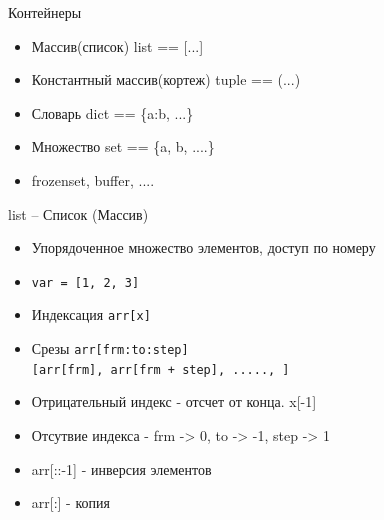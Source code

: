 \documentclass{article}
\begin{document}
\LARGE

\begin{center} Контейнеры \end{center}
\begin{itemize}
	\item Массив(список) list == [...]
	\item Константный массив(кортеж) tuple == (...)
	\item Словарь dict == \{a:b, ...\}
	\item Множество set == \{a, b, ....\}
	\item frozenset, buffer, ....
\end{itemize}
\newpage

\begin{center} list – Список (Массив) \end{center}
\begin{itemize}
	\item Упорядоченное множество элементов, доступ по номеру
	\item \lstinline!var = [1, 2, 3]!
	\item Индексация \lstinline!arr[x]!
	\item Срезы 
			\lstinline!arr[frm:to:step]! \\
			\lstinline![arr[frm], arr[frm + step], ....., ]!
	\item Отрицательный индекс - отсчет от конца. x[-1]
	\item Отсутвие индекса - frm -> 0, to -> -1, step -> 1
	\item arr[::-1] - инверсия элементов
	\item arr[:] - копия
\end{itemize}
\newpage
\end{document}
